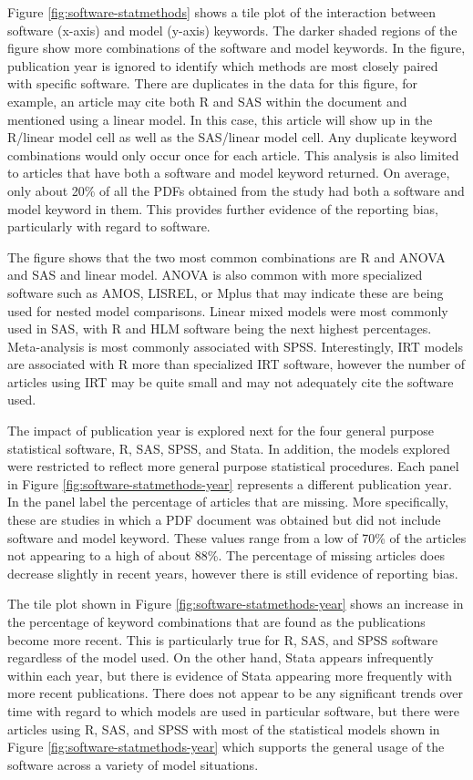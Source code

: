 \documentclass[english,,man]{apa6}
\begin{document}
Figure \ref{fig:software-statmethods} shows a tile plot of the interaction between software (x-axis) and model (y-axis) keywords. The darker shaded regions of the figure show more combinations of the software and model keywords. In the figure, publication year is ignored to identify which methods are most closely paired with specific software. There are duplicates in the data for this figure, for example, an article may cite both R and SAS within the document and mentioned using a linear model. In this case, this article will show up in the R/linear model cell as well as the SAS/linear model cell. Any duplicate keyword combinations would only occur once for each article. This analysis is also limited to articles that have both a software and model keyword returned. On average, only about 20\% of all the PDFs obtained from the study had both a software and model keyword in them. This provides further evidence of the reporting bias, particularly with regard to software.

The figure shows that the two most common combinations are R and ANOVA and SAS and linear model. ANOVA is also common with more specialized software such as AMOS, LISREL, or Mplus that may indicate these are being used for nested model comparisons. Linear mixed models were most commonly used in SAS, with R and HLM software being the next highest percentages. Meta-analysis is most commonly associated with SPSS. Interestingly, IRT models are associated with R more than specialized IRT software, however the number of articles using IRT may be quite small and may not adequately cite the software used.

The impact of publication year is explored next for the four general purpose statistical software, R, SAS, SPSS, and Stata. In addition, the models explored were restricted to reflect more general purpose statistical procedures. Each panel in Figure \ref{fig:software-statmethods-year} represents a different publication year. In the panel label the percentage of articles that are missing. More specifically, these are studies in which a PDF document was obtained but did not include software and model keyword. These values range from a low of 70\% of the articles not appearing to a high of about 88\%. The percentage of missing articles does decrease slightly in recent years, however there is still evidence of reporting bias.

The tile plot shown in Figure \ref{fig:software-statmethods-year} shows an increase in the percentage of keyword combinations that are found as the publications become more recent. This is particularly true for R, SAS, and SPSS software regardless of the model used. On the other hand, Stata appears infrequently within each year, but there is evidence of Stata appearing more frequently with more recent publications. There does not appear to be any significant trends over time with regard to which models are used in particular software, but there were articles using R, SAS, and SPSS with most of the statistical models shown in Figure \ref{fig:software-statmethods-year} which supports the general usage of the software across a variety of model situations.
\end{document}
